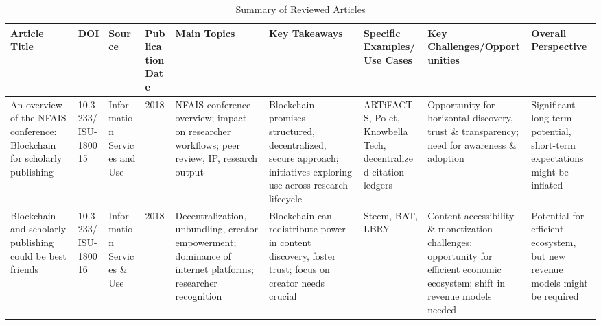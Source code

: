 \documentclass{article}
\begin{document}
\begin{landscape}
    \begin{table}[ht]
        \centering
        \caption{Summary of Reviewed Articles}
        \label{table:reviewed_articles}

        \renewcommand{\arraystretch}{1.4}
        \begin{tabularx}{\linewidth}{|p{3.5cm}|p{2.5cm}|p{3cm}|p{1.8cm}|X|X|X|X|X|}
            \hline
            \textbf{Article Title}                                                                                                             & \textbf{DOI}                  & \textbf{Source}                                                & \textbf{Publication Date} & \textbf{Main Topics}                                                                                                        & \textbf{Key Takeaways}                                                                                                                         & \textbf{Specific Examples/Use Cases}                                                                    & \textbf{Key Challenges/Opportunities}                                                                                               & \textbf{Overall Perspective}                                                                          \\
            \hline
            An overview of the NFAIS conference: Blockchain for scholarly publishing                                                           & 10.3233/ISU-180015            & Information Services and Use                                   & 2018                      & NFAIS conference overview; impact on researcher workflows; peer review, IP, research output                                 & Blockchain promises structured, decentralized, secure approach; initiatives exploring use across research lifecycle                            & ARTiFACTS, Po-et, Knowbella Tech, decentralized citation ledgers                                        & Opportunity for horizontal discovery, trust \& transparency; need for awareness \& adoption                                         & Significant long-term potential, short-term expectations might be inflated                            \\
            \hline
            Blockchain and scholarly publishing could be best friends                                                                          & 10.3233/ISU-180016            & Information Services \& Use                                    & 2018                      & Decentralization, unbundling, creator empowerment; dominance of internet platforms; researcher recognition                  & Blockchain can redistribute power in content discovery, foster trust; focus on creator needs crucial                                           & Steem, BAT, LBRY                                                                                        & Content accessibility \& monetization challenges; opportunity for efficient economic ecosystem; shift in revenue models needed      & Potential for efficient ecosystem, but new revenue models might be required                           \\

\end{tabularx}
\end{table}
\end{landscape}
\end{document}
